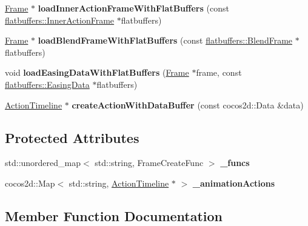 \begin{DoxyCompactItemize}
\hyperlink{classFrame}{Frame} $\ast$ {\bfseries load\+Inner\+Action\+Frame\+With\+Flat\+Buffers} (const \hyperlink{structflatbuffers_1_1InnerActionFrame}{flatbuffers\+::\+Inner\+Action\+Frame} $\ast$flatbuffers)
\item 
\mbox{\label{classActionTimelineCache_ab53d7409db5158a62a17942d752ea896}} 
\hyperlink{classFrame}{Frame} $\ast$ {\bfseries load\+Blend\+Frame\+With\+Flat\+Buffers} (const \hyperlink{structflatbuffers_1_1BlendFrame}{flatbuffers\+::\+Blend\+Frame} $\ast$flatbuffers)
\item 
\mbox{\label{classActionTimelineCache_a0b1baa3cedaf8a94bc5229c8d0b7f822}} 
void {\bfseries load\+Easing\+Data\+With\+Flat\+Buffers} (\hyperlink{classFrame}{Frame} $\ast$frame, const \hyperlink{structflatbuffers_1_1EasingData}{flatbuffers\+::\+Easing\+Data} $\ast$flatbuffers)
\item 
\mbox{\label{classActionTimelineCache_a2317eb2e863a486075968346b4ac01df}} 
\hyperlink{classActionTimeline}{Action\+Timeline} $\ast$ {\bfseries create\+Action\+With\+Data\+Buffer} (const cocos2d\+::\+Data \&data)
\end{DoxyCompactItemize}
\subsection*{Protected Attributes}
\begin{DoxyCompactItemize}
\item 
\mbox{\label{classActionTimelineCache_a6948c115c82a73aced829c08b4c99a9e}} 
std\+::unordered\+\_\+map$<$ std\+::string, Frame\+Create\+Func $>$ {\bfseries \+\_\+funcs}
\item 
\mbox{\label{classActionTimelineCache_a3a5cd6e732b596b5c0f8bd16161987ba}} 
cocos2d\+::\+Map$<$ std\+::string, \hyperlink{classActionTimeline}{Action\+Timeline} $\ast$ $>$ {\bfseries \+\_\+animation\+Actions}
\end{DoxyCompactItemize}


\subsection{Member Function Documentation}
\mbox{\label{classActionTimelineCache_a93cfb036b5aa2614f357f088aa82dc45}} 
